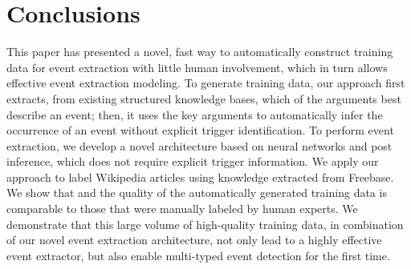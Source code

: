 \section{Conclusions}
This paper has presented a novel, fast way to automatically construct training data for event extraction with little human involvement,
which in turn allows effective event extraction modeling. To generate training data, our approach first extracts, from existing structured
knowledge bases, which of the arguments best describe an event; then, it uses the key arguments to automatically infer the occurrence of an
event without explicit trigger identification. To perform event extraction, we develop a novel architecture based on neural networks and
post inference, which does not require explicit trigger information. We apply our approach to label Wikipedia articles using knowledge
extracted from Freebase. We show that and the quality of the automatically generated training data is comparable to those that were
manually labeled by human experts. We demonstrate that this large volume of high-quality training data, in combination of our novel event
extraction architecture, not only lead to a highly effective event extractor, but also enable multi-typed event detection for the first
time.




%
